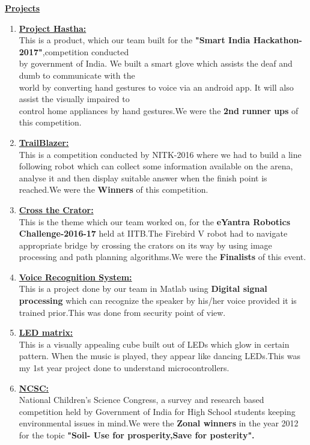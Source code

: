 \documentclass[10pt]{article}
\begin{document}
\underline{\textbf{\Large{Projects}}}
\begin{enumerate}
	\item{\underline{\textbf{\large{Project Hastha:}}}\\ 
		This is a product, which our team built for the \textbf{"Smart India Hackathon-2017"},competition conducted\\ by government of India. We built a smart glove which assists the deaf and dumb to communicate with the\\ world by converting hand gestures to voice via an android app. It will also assist the visually impaired to\\ control home appliances by hand gestures.We were the \textbf{2nd runner ups} of this competition.}
	\item{\underline{\textbf{\large{TrailBlazer:}}}\\
		This is a competition conducted by NITK-2016 where we had to build a line following robot which can collect some information available on the arena, analyse it and then display suitable answer when the finish point is reached.We were the \textbf{Winners} of this competition. }
	\item{\underline{\textbf{\large{Cross the Crator:}}}\\ This is the theme which our team worked on, for the \textbf{eYantra Robotics Challenge-2016-17} held at IITB.The Firebird V robot had to navigate appropriate bridge by crossing the crators on its way by using image processing and path planning algorithms.We were the \textbf{Finalists} of this event.  }
	\item{\underline{\textbf{\large{Voice Recognition System:}}}\\This is a project done by our team in Matlab using \textbf{Digital signal processing} which can recognize the speaker by his/her voice provided it is trained prior.This was done from security point of view. }
	\item{\underline{\textbf{\large{LED matrix:}}} \\This is a visually appealing cube built out of LEDs which glow in certain pattern. When the music is played, they appear like dancing LEDs.This was my 1st year project done to understand microcontrollers. }
	\item{\underline{\textbf{\large{NCSC:}}} \\National Children's Science Congress, a survey and research based competition held by Government of India for High School students keeping environmental issues in mind.We were the \textbf{Zonal winners} in the year 2012 for the topic \textbf{"Soil- Use for prosperity,Save for posterity".}} 
\end{enumerate}
\hfill
\end{document}
